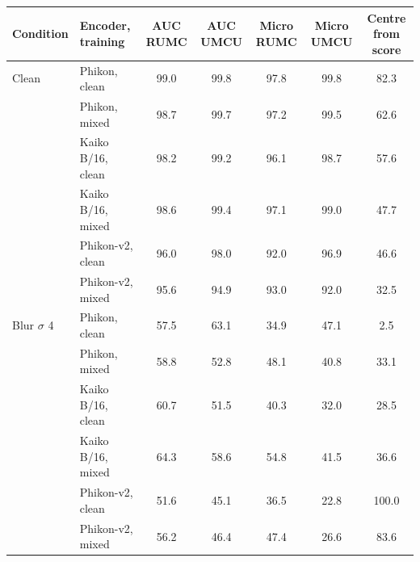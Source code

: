 \begin{tabular}{@{}llccccc@{}}
\toprule
Condition & Encoder, training & AUC RUMC & AUC UMCU & Micro RUMC & Micro UMCU & Centre from score\\
\midrule
Clean & Phikon, clean & 99.0 & 99.8 & 97.8 & 99.8 & 82.3\\
 & Phikon, mixed & 98.7 & 99.7 & 97.2 & 99.5 & 62.6\\
 & Kaiko B/16, clean & 98.2 & 99.2 & 96.1 & 98.7 & 57.6\\
 & Kaiko B/16, mixed & 98.6 & 99.4 & 97.1 & 99.0 & 47.7\\
 & Phikon-v2, clean & 96.0 & 98.0 & 92.0 & 96.9 & 46.6\\
 & Phikon-v2, mixed & 95.6 & 94.9 & 93.0 & 92.0 & 32.5\\
\addlinespace
Blur $\sigma$ 4 & Phikon, clean & 57.5 & 63.1 & 34.9 & 47.1 & 2.5\\
 & Phikon, mixed & 58.8 & 52.8 & 48.1 & 40.8 & 33.1\\
 & Kaiko B/16, clean & 60.7 & 51.5 & 40.3 & 32.0 & 28.5\\
 & Kaiko B/16, mixed & 64.3 & 58.6 & 54.8 & 41.5 & 36.6\\
 & Phikon-v2, clean & 51.6 & 45.1 & 36.5 & 22.8 & 100.0\\
 & Phikon-v2, mixed & 56.2 & 46.4 & 47.4 & 26.6 & 83.6\\
\bottomrule
\end{tabular}